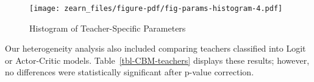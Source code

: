 \documentclass[
  number,
  preprint,
  3p,
  onecolumn]{elsarticle}
\begin{document}
\begin{figure}
\begin{minipage}{0.33\linewidth}
{\texttt{[image: zearn\_files/figure-pdf/fig-params-histogram-4.pdf]}

}


\end{minipage}%
%
\begin{minipage}{0.33\linewidth}



\end{minipage}%
%
\begin{minipage}{0.33\linewidth}



\end{minipage}%
\newline
\begin{minipage}{0.33\linewidth}



\end{minipage}%

\caption{\label{fig-params-histogram}Histogram of Teacher-Specific
Parameters}

\end{figure}%

Our heterogeneity analysis also included comparing teachers classified
into Logit or Actor-Critic models. Table~\ref{tbl-CBM-teachers} displays
these results; however, no differences were statistically significant
after p-value correction.
\end{document}
